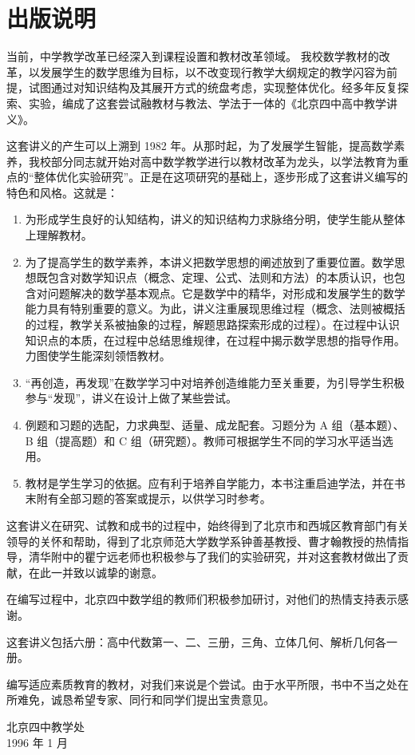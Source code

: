 \chapter{出版说明}

当前，中学教学改革已经深入到课程设置和教材改革领域。
我校数学教材的改革，以发展学生的数学思维为目标，以不改变现行教学大纲规定的教学闪容为前提，试图通过对知识结构及其展开方式的统盘考虑，实现整体优化。经多年反复探索、实验，编成了这套尝试融教材与教法、学法于一体的《北京四中高中教学讲义》。

这套讲义的产生可以上溯到 1982 年。从那时起，为了发展学生智能，提高数学素养，我校部分同志就开始对高中数学教学进行以教材改革为龙头，以学法教育为重点的“整体优化实验研究”。正是在这项研究的基础上，逐步形成了这套讲义编写的特色和风格。这就是：
\begin{enumerate}
    \item 为形成学生良好的认知结构，讲义的知识结构力求脉络分明，使学生能从整体上理解教材。
    \item 为了提高学生的数学素养，本讲义把数学思想的阐述放到了重要位置。数学思想既包含对数学知识点（概念、定理、公式、法则和方法）的本质认识，也包含对问题解决的数学基本观点。它是数学中的精华，对形成和发展学生的数学能力具有特别重要的意义。为此，讲义注重展现思维过程（概念、法则被概括的过程，教学关系被抽象的过程，解题思路探索形成的过程）。在过程中认识知识点的本质，在过程中总结思维规律，在过程中揭示数学思想的指导作用。力图使学生能深刻领悟教材。
    \item “再创造，再发现”在数学学习中对培养创造维能力至关重要，为引导学生积极参与“发现”，讲义在设计上做了某些尝试。
    \item 例题和习题的选配，力求典型、适量、成龙配套。习题分为 A 组（基本题）、 B 组（提高题）和 C 组（研究题）。教师可根据学生不同的学习水平适当选用。
    \item 教材是学生学习的依据。应有利于培养自学能力，本书注重启迪学法，并在书末附有全部习题的答案或提示，以供学习时参考。
 \end{enumerate}   

这套讲义在研究、试教和成书的过程中，始终得到了北京市和西城区教育部门有关领导的关怀和帮助，得到了北京师范大学数学系钟善基教授、曹才翰教授的热情指导，清华附中的瞿宁远老师也积极参与了我们的实验研究，并对这套教材做出了贡献，在此一并致以诚挚的谢意。

在编写过程中，北京四中数学组的教师们积极参加研讨，对他们的热情支持表示感谢。

这套讲义包括六册：高中代数第一、二、三册，三角、立体几何、解析几何各一册。

编写适应素质教育的教材，对我们来说是个尝试。由于水平所限，书中不当之处在所难免，诚恳希望专家、同行和同学们提出宝贵意见。

\begin{flushright}
    北京四中教学处\\
    1996 年 1 月
\end{flushright}